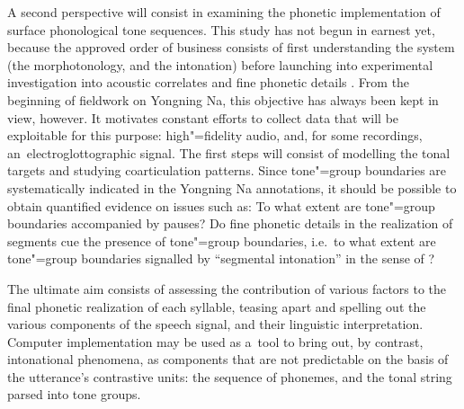 A second perspective will consist in examining the phonetic
implementation of surface phonological tone sequences. This study has
not begun in earnest yet, because the approved order of business
consists of first understanding the system (the morphotonology, and the
{intonation}) before launching into experimental investigation into
acoustic correlates and fine phonetic details
\citep{rice2014,mazaudon2014}. From the beginning of fieldwork on
Yongning Na, this objective has always been kept in view, however. It
motivates constant efforts to collect data that will be exploitable
for this purpose: high"=fidelity audio, and, for some recordings, an~electroglottographic signal. The first steps will consist of modelling
the tonal targets and studying {coarticulation} patterns. Since tone"=group boundaries are systematically
indicated in the Yongning Na annotations, it should be possible to
obtain quantified evidence on issues such as: To what extent are
tone"=group boundaries accompanied by pauses? Do fine phonetic details
in the realization of segments cue the presence of tone"=group
boundaries, i.e.\ to what extent are tone"=group boundaries signalled by
“segmental {intonation}” in the sense of \citet{niebuhr2009}?

The ultimate aim consists of assessing the contribution of various factors to the final phonetic realization of each syllable, teasing apart and spelling out the various components of the speech signal, and their linguistic interpretation. Computer implementation may be used as a~tool to bring out, by contrast, intonational phenomena, as components that are not predictable on the basis of the utterance’s contrastive units: the sequence of phonemes, and the tonal string parsed into tone groups. 

%

